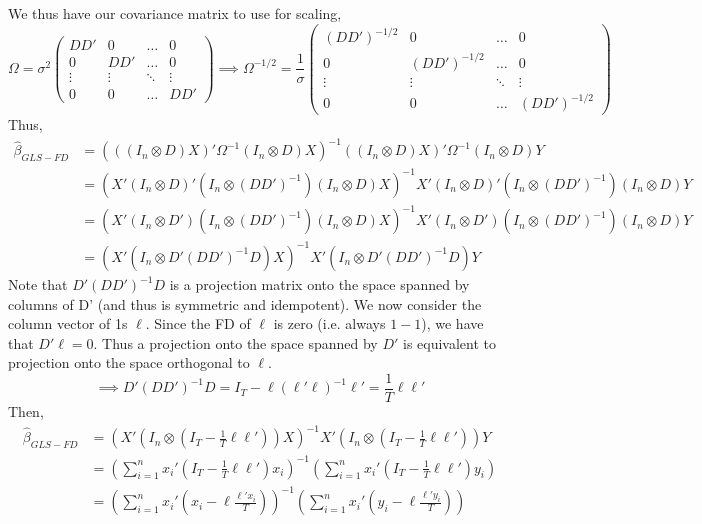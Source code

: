 \documentclass[DIV=14,titlepage=false]{scrreprt}
\begin{document}
We thus have our covariance matrix to use for scaling,
\[
    \Omega = \sigma^2 \begin{pmatrix}
        DD' & 0 & \hdots & 0 \\
        0 & DD' & \hdots & 0 \\
        \vdots & \vdots & \ddots & \vdots \\
        0 & 0 & \hdots & DD'  \end{pmatrix}
    \implies \Omega^{-1/2} = \frac{1}{\sigma}\begin{pmatrix}
        (DD')^{-1/2} & 0 & \hdots & 0 \\
        0 & (DD')^{-1/2} & \hdots & 0 \\
        \vdots & \vdots & \ddots & \vdots \\
        0 & 0 & \hdots & (DD')^{-1/2}  \end{pmatrix} 
\]
Thus,
\begin{align*}
    \hat \beta_{GLS-FD} &= \left(((I_n \otimes D)X)'\Omega^{-1}(I_n \otimes D)X\right)^{-1}((I_n \otimes D)X)'\Omega^{-1}(I_n \otimes D)Y \\
    &= \left(X'(I_n \otimes D)' (I_n \otimes (DD')^{-1}) (I_n \otimes D)X\right)^{-1}X'(I_n \otimes D)'(I_n \otimes (DD')^{-1}) (I_n \otimes D)Y \\
    &=\left(X'(I_n \otimes D') (I_n \otimes (DD')^{-1}) (I_n \otimes D)X\right)^{-1}X'(I_n \otimes D')(I_n \otimes (DD')^{-1}) (I_n \otimes D)Y \\
    &=\left(X'(I_n \otimes D'(DD')^{-1}D)X\right)^{-1}X'(I_n \otimes D'(DD')^{-1}D)Y 
\end{align*}
Note that $D'(DD')^{-1}D$  is a projection matrix onto the space spanned by columns of D' (and thus is symmetric and idempotent). We now consider the column vector of 1s $\ell$. Since the FD of $\ell$ is zero (i.e. always $1-1$), we have that $D'\ell = 0$. Thus a projection onto the space spanned by $D'$ is equivalent to projection onto the space orthogonal to $\ell$.
\[ \implies D'(DD')^{-1}D = I_T - \ell(\ell'\ell)^{-1}\ell' = \frac{1}{T}\ell\ell'\]
Then,
\begin{align*}
    \hat \beta_{GLS-FD} &= \left(X'(I_n \otimes (I_T - \frac{1}{T}\ell\ell'))X\right)^{-1}X'(I_n \otimes (I_T - \frac{1}{T}\ell\ell'))Y \\
    &=\left(\sum_{i=1}^{n}x_i'(I_T - \frac{1}{T}\ell\ell')x_i\right)^{-1} \left(\sum_{i=1}^{n}x_i'(I_T - \frac{1}{T}\ell\ell')y_i\right)\\
    &= \left(\sum_{i=1}^{n}x_i'(x_i - \ell\frac{\ell'x_i}{T})\right)^{-1} \left(\sum_{i=1}^{n}x_i'(y_i - \ell\frac{\ell'y_i}{T})\right)
\end{align*}
\end{document}
